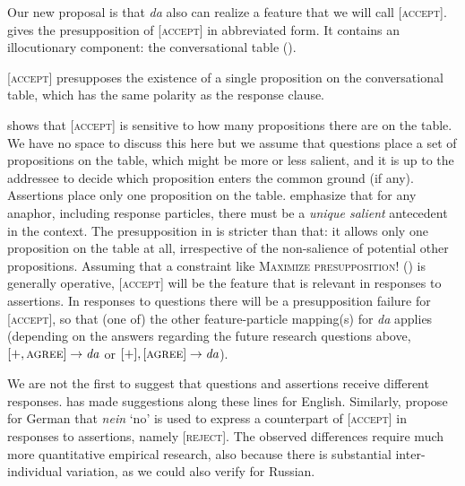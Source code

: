 \documentclass[output=paper,colorlinks,citecolor=brown]{langscibook}
\begin{document}
Our new proposal is that \textit{da} also can realize a feature that we will call [\textsc{accept}].  gives the presupposition of [\textsc{accept}] in abbreviated form. It contains an illocutionary component: the conversational table (\citealt{FarkasBruce2010}). 

\eanoraggedright\label{geist-repp:ex:ACCEPT-presupposes}
[\textsc{accept}] presupposes the existence of a single proposition on the conversational table, which has the same polarity as the response clause. 
\z

\noindent {} shows that [\textsc{accept}] is sensitive to how many propositions there are on the table. We have no space to discuss this here but we assume that questions place a set of propositions on the table, which might be more or less salient, and it is up to the addressee to decide which proposition enters the common ground (if any). Assertions place only one proposition on the table. \citet{RoelofsenFarkas2015} emphasize that for any anaphor, including response particles, there must be a \textit{unique salient} antecedent in the context. The presupposition in  is stricter than that: it allows only one proposition on the table at all, irrespective of the non-salience of potential other propositions. Assuming that a constraint like \textsc{Maximize presupposition!} (\citealt{Heim1991}) is generally operative, [\textsc{accept}] will be the feature that is relevant in responses to assertions. In responses to questions there will be a presupposition failure for [\textsc{accept}], so that (one of) the other feature-particle mapping(s) for \textit{da} applies (depending on the answers regarding the future research questions above, $[+,\textsc{agree}]\rightarrow\textit{da}$ or $[+],[\textsc{agree}]\rightarrow\textit{da}$).

We are not the first to suggest that questions and assertions receive different responses. \citet{Holmberg2015} has made suggestions along these lines for English. Similarly, \citet{ReppClausFruehauf} propose for German that \textit{nein} ‘no’ is used to express a counterpart of [\textsc{accept}] in responses to assertions, namely [\textsc{reject}]. The observed differences require much more quantitative empirical research, also because there is substantial inter-individual variation, as we could also verify for Russian. 
\end{document}
